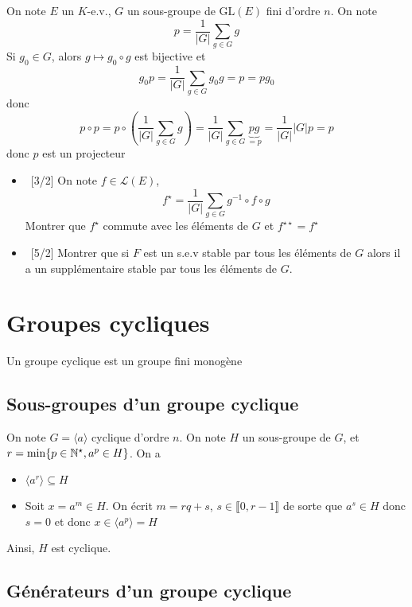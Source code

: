 On note $E$ un $K$-e.v., $G$ un sous-groupe de $\mathrm{GL}(E)$ fini d'ordre $n$. On note \[
    p= \frac{1}{|G|} \sum_{g\in G} g
\]
Si $g_0\in G$, alors $g\longmapsto g_0\circ g$ est bijective et \[
    g_0 p=\frac1{|G|}\sum_{g\in G}g_0 g=p=pg_0
\]
donc \[
    p\circ p=p\circ \left( \frac1{|G|}\sum_{g\in G} g\right)=\frac1{|G|}\sum_{g\in G}\underbrace{pg}_{=p}=\frac1{|G|}|G|p=p
\]
donc $p$ est un projecteur


\begin{exo}
    \begin{itemize}
        \item ~[3/2] On note $f\in \mathcal L(E)$, \[
                f^\star = \frac1{|G|}\sum_{g\in G}g^{-1}\circ f\circ g
            \]
            Montrer que $f^\star$ commute avec les éléments de $G$ et $f^{\star\star}=f^\star$
        \item ~[5/2] Montrer que si $F$ est un s.e.v stable par tous les éléments de $G$ alors il a un supplémentaire stable par tous les éléments de $G$.
    \end{itemize}
\end{exo}

\section{Groupes cycliques}

\begin{dfn}
    Un groupe cyclique est un groupe fini monogène
\end{dfn}

\subsection{Sous-groupes d'un groupe cyclique}

On note $G=\langle a\rangle$ cyclique d'ordre $n$. On note $H$ un sous-groupe de $G$, et $r=\min\{p\in\mathbb N^\star, a^p\in H\}$. On a \begin{itemize}
    \item $\langle a^r\rangle\subseteq H$
    \item Soit $x=a^m\in H$. On écrit $m=rq+s$, $s\in\llbracket 0, r-1\rrbracket$ de sorte que $a^s\in H$ donc $s=0$ et donc $x\in \langle a^p\rangle=H$
\end{itemize}

Ainsi, $H$ est cyclique.

\subsection{Générateurs d'un groupe cyclique}

